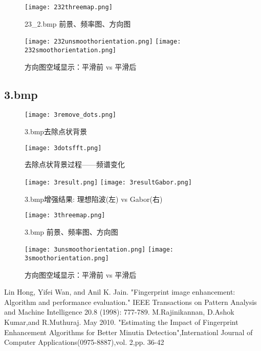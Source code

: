 \documentclass[UTF8]{ctexart}
\begin{document}
\begin{figure}[H]
    \centering
    \texttt{[image: 232threemap.png]}
    \caption{23\_2.bmp 前景、频率图、方向图}
\end{figure}

\begin{figure}[H]
    \centering
    \texttt{[image: 232unsmoothorientation.png]}
    \texttt{[image: 232smoothorientation.png]}
    \caption{方向图空域显示：平滑前 vs 平滑后}
\end{figure}


\subsection{3.bmp}
\begin{figure}[H]
    \centering
    \texttt{[image: 3remove\_dots.png]}
    \caption{3.bmp去除点状背景}
\end{figure}

\begin{figure}[H]
    \centering
    \texttt{[image: 3dotsfft.png]}
    \caption{去除点状背景过程——频谱变化}
\end{figure}


\begin{figure}[H]
    \centering
    \texttt{[image: 3result.png]}
    \texttt{[image: 3resultGabor.png]}
    \caption{3.bmp增强结果: 理想陷波(左) vs Gabor(右)}
\end{figure}

\begin{figure}[H]
    \centering
    \texttt{[image: 3threemap.png]}
    \caption{3.bmp 前景、频率图、方向图}
\end{figure}

\begin{figure}[H]
    \centering
    \texttt{[image: 3unsmoothorientation.png]}
    \texttt{[image: 3smoothorientation.png]}
    \caption{方向图空域显示：平滑前 vs 平滑后}
\end{figure}

\begin{thebibliography}{99}
    Lin Hong, Yifei Wan, and Anil K. Jain. "Fingerprint image enhancement: Algorithm and performance evaluation." IEEE Transactions on Pattern Analysis and Machine Intelligence 20.8 (1998): 777-789.
     M.Rajinikannan, D.Ashok Kumar,and R.Muthuraj. May 2010. "Estimating the Impact of Fingerprint Enhancement Algorithms for Better Minutia Detection",Internationl Journal of Computer Applications(0975-8887),vol. 2,pp. 36-42
\end{thebibliography}
\end{document}
